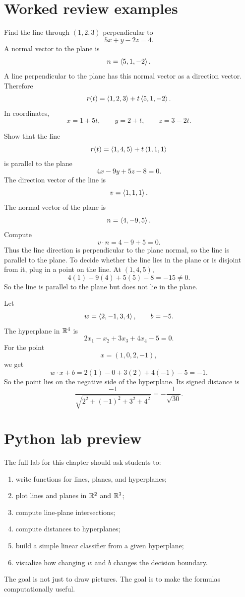 \section{Worked review examples}

\begin{examplebox}[title={Example 4.11: Line perpendicular to a plane}]
Find the line through $(1,2,3)$ perpendicular to
\[
  5x+y-2z=4.
\]
A normal vector to the plane is
\[
  n=\left\langle 5,1,-2\right\rangle.
\]
A line perpendicular to the plane has this normal vector as a direction vector. Therefore
\[
  r(t)=\left\langle 1,2,3\right\rangle+t\left\langle 5,1,-2\right\rangle.
\]
In coordinates,
\[
  x=1+5t,\qquad y=2+t,\qquad z=3-2t.
\]
\end{examplebox}

\begin{examplebox}[title={Example 4.12: Is a line parallel to a plane?}]
Show that the line
\[
  r(t)=\left\langle 1,4,5\right\rangle+t\left\langle 1,1,1\right\rangle
\]
is parallel to the plane
\[
  4x-9y+5z-8=0.
\]
The direction vector of the line is
\[
  v=\left\langle 1,1,1\right\rangle.
\]
The normal vector of the plane is
\[
  n=\left\langle 4,-9,5\right\rangle.
\]
Compute
\[
  v\cdot n=4-9+5=0.
\]
Thus the line direction is perpendicular to the plane normal, so the line is parallel to the plane. To decide whether the line lies in the plane or is disjoint from it, plug in a point on the line. At $(1,4,5)$,
\[
  4(1)-9(4)+5(5)-8=-15\ne 0.
\]
So the line is parallel to the plane but does not lie in the plane.
\end{examplebox}

\begin{examplebox}[title={Example 4.13: A hyperplane in four dimensions}]
Let
\[
  w=\left\langle 2,-1,3,4\right\rangle,\qquad b=-5.
\]
The hyperplane in $\mathbb{R}^4$ is
\[
  2x_1-x_2+3x_3+4x_4-5=0.
\]
For the point
\[
  x=(1,0,2,-1),
\]
we get
\[
  w\cdot x+b=2(1)-0+3(2)+4(-1)-5=-1.
\]
So the point lies on the negative side of the hyperplane. Its signed distance is
\[
  \frac{-1}{\sqrt{2^2+(-1)^2+3^2+4^2}}=-\frac{1}{\sqrt{30}}.
\]
\end{examplebox}

\section{Python lab preview}

The full lab for this chapter should ask students to:
\begin{enumerate}
\item write functions for lines, planes, and hyperplanes;
\item plot lines and planes in $\mathbb{R}^2$ and $\mathbb{R}^3$;
\item compute line-plane intersections;
\item compute distances to hyperplanes;
\item build a simple linear classifier from a given hyperplane;
\item visualize how changing $w$ and $b$ changes the decision boundary.
\end{enumerate}
The goal is not just to draw pictures. The goal is to make the formulas computationally useful.

